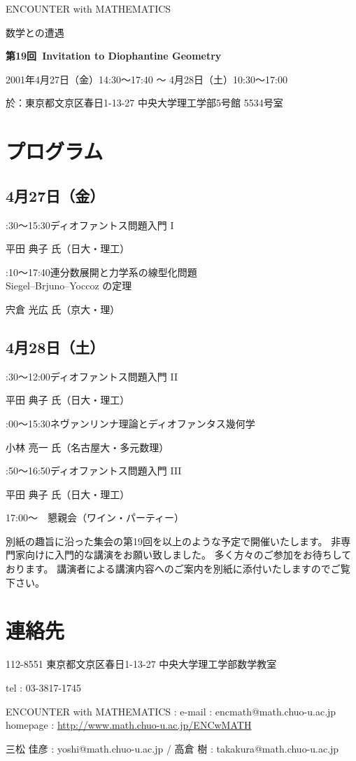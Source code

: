 \documentclass[uplatex,dvipdfmx]{jlreq}
\newcommand{\talk}[3]{%
\noindent
#1\quad #2\par
\hspace*{2em}#3\par\smallskip
}
\newcommand{\EwMnumber}{第19回}
\newcommand{\EwMtitle}{Invitation to Diophantine Geometry}
\newcommand{\EwMdate}{2001年4月27日（金）14:30～17:40 ～ 4月28日（土）10:30～17:00}
\newcommand{\EwMplace}{東京都文京区春日1-13-27 中央大学理工学部5号館 5534号室}
\newcommand{\EwMtitleblock}{

\vspace*{-5mm}

\begin{center}

{\Large ENCOUNTER with MATHEMATICS}

\vspace{2mm}

{\large 数学との遭遇}

\vspace{4mm}

{\Large \bfseries \EwMnumber\ \EwMtitle}

\vspace{4mm}

\EwMdate

\vspace{2mm}

於：\EwMplace

\end{center}

\vspace{2mm}

}
\begin{document}
\EwMtitleblock


\section*{プログラム}

\subsection*{4月27日（金）}

\talk
{14:30～15:30}
{ディオファントス問題入門 I}
{平田 典子 氏（日大・理工）}

\talk
{16:10～17:40}
{連分数展開と力学系の線型化問題\\[1mm]Siegel–Brjuno–Yoccoz の定理}
{宍倉 光広 氏（京大・理）}

\subsection*{4月28日（土）}

\talk
{10:30～12:00}
{ディオファントス問題入門 II}
{平田 典子 氏（日大・理工）}

\talk
{14:00～15:30}
{ネヴァンリンナ理論とディオファンタス幾何学}
{小林 亮一 氏（名古屋大・多元数理）}

\talk
{15:50～16:50}
{ディオファントス問題入門 III}
{平田 典子 氏（日大・理工）}

\bigskip

17:00～　懇親会（ワイン・パーティー）


\bigskip

別紙の趣旨に沿った集会の第19回を以上のような予定で開催いたします。  
非専門家向けに入門的な講演をお願い致しました。  
多く方々のご参加をお待ちしております。  
講演者による講演内容へのご案内を別紙に添付いたしますのでご覧下さい。


\section*{連絡先}

112-8551 東京都文京区春日1-13-27 中央大学理工学部数学教室 

tel : 03-3817-1745  

ENCOUNTER with MATHEMATICS : e-mail : encmath@math.chuo-u.ac.jp  
homepage : \url{http://www.math.chuo-u.ac.jp/ENCwMATH}  

三松 佳彦 : yoshi@math.chuo-u.ac.jp / 高倉 樹 : takakura@math.chuo-u.ac.jp
\end{document}
